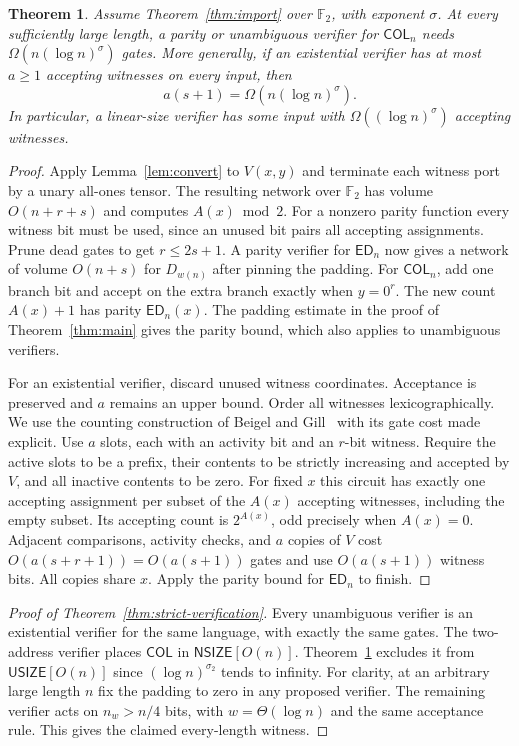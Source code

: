 \documentclass[11pt]{article}
\newtheorem{theorem}{Theorem}[section]
\theoremstyle{definition}
\theoremstyle{remark}
\newcommand{\ED}{\mathsf{ED}}
\newcommand{\F}{\mathbb{F}}
\newcommand{\USIZE}{\mathsf{USIZE}}
\newcommand{\NSIZE}{\mathsf{NSIZE}}
\begin{document}
\begin{theorem}\label{thm:ambiguity}
Assume Theorem~\ref{thm:import} over $\F_2$, with exponent $\sigma$.
At every sufficiently large length, a parity or unambiguous verifier
for $\mathsf{COL}_n$ needs $\Omega(n(\log n)^\sigma)$ gates. More
generally, if an existential verifier has at most $a\ge1$ accepting
witnesses on every input, then
\[
                 a(s+1)=\Omega(n(\log n)^\sigma).
\]
In particular, a linear-size verifier has some input with
$\Omega((\log n)^\sigma)$ accepting witnesses.
\end{theorem}
\begin{proof}
Apply Lemma~\ref{lem:convert} to $V(x,y)$ and terminate each witness
port by a unary all-ones tensor. The resulting network over $\F_2$
has volume $O(n+r+s)$ and computes $A(x)\bmod 2$. For a nonzero
parity function every witness bit must be used, since an unused bit
pairs all accepting assignments. Prune dead gates to get $r\le2s+1$.
A parity verifier for $\ED_n$ now gives a network of volume $O(n+s)$
for $D_{w(n)}$ after pinning the padding. For $\mathsf{COL}_n$, add
one branch bit and accept on the extra branch exactly when $y=0^r$.
The new count $A(x)+1$ has parity $\ED_n(x)$. The padding estimate in
the proof of Theorem~\ref{thm:main} gives the parity bound, which
also applies to unambiguous verifiers.

For an existential verifier, discard unused witness coordinates.
Acceptance is preserved and $a$ remains an upper bound. Order all
witnesses lexicographically. We use the counting construction of
Beigel and Gill~\cite{BG} with its gate cost made explicit.
Use $a$ slots, each with an activity
bit and an $r$-bit witness. Require the active slots to be a prefix,
their contents to be strictly increasing and accepted by $V$, and
all inactive contents to be zero. For fixed $x$ this circuit has
exactly one accepting assignment per subset of the $A(x)$ accepting
witnesses, including the empty subset. Its accepting count is
$2^{A(x)}$, odd precisely when $A(x)=0$. Adjacent comparisons,
activity checks, and $a$ copies of $V$ cost $O(a(s+r+1))=O(a(s+1))$
gates and use $O(a(s+1))$ witness bits. All copies share $x$.
Apply the parity bound for $\ED_n$ to finish.
\end{proof}
\begin{proof}[Proof of Theorem~\ref{thm:strict-verification}]
Every unambiguous verifier is an existential verifier for the same
language, with exactly the same gates. The two-address verifier places
$\mathsf{COL}$ in $\NSIZE[O(n)]$. Theorem~\ref{thm:ambiguity} excludes
it from $\USIZE[O(n)]$ since $(\log n)^{\sigma_2}$ tends to infinity.
For clarity, at an arbitrary large length $n$ fix the padding to zero
in any proposed verifier. The remaining verifier acts on $n_w>n/4$
bits, with $w=\Theta(\log n)$ and the same acceptance rule. This gives
the claimed every-length witness.
\end{proof}
\end{document}

